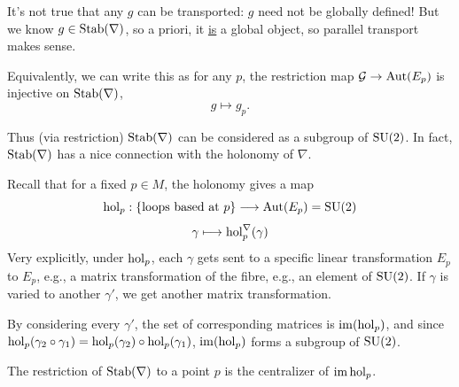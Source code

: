 \documentclass[main]{subfiles}
\begin{document}
\begin{remark}
It's not true that any $g$ can be transported: $g$ need not be globally defined! But we know $g\in\operatorname{Stab}(\nabla)$, so a priori, it \underline{is} a global object, so parallel transport makes sense.
\end{remark}

Equivalently, we can write this as for any $p$, the restriction map $\mathcal{G}\to\operatorname{Aut}(E_p)$ is injective on $\operatorname{Stab}(\nabla)$,
\[
g \longmapsto g_p.
\]

Thus (via restriction) $\operatorname{Stab}(\nabla)$ can be considered as a subgroup of $\operatorname{SU}(2)$. In fact, $\operatorname{Stab}(\nabla)$ has a nice connection with the holonomy of $\nabla$.

Recall that for a fixed $p\in M$, the holonomy gives a map
\[
\operatorname{hol}_p : \left\{\text{loops based at } p\right\} \longrightarrow \operatorname{Aut}(E_p) = \operatorname{SU}(2)
\]
\[
\gamma \longmapsto \operatorname{hol}_p^\nabla(\gamma)
\]
Very explicitly, under $\operatorname{hol}_p$, each $\gamma$ gets sent to a specific linear transformation $E_p$ to $E_p$, e.g., a matrix transformation of the fibre, e.g., an element of $\operatorname{SU}(2)$. If $\gamma$ is varied to another $\gamma'$, we get another matrix transformation.

By considering every $\gamma'$, the set of corresponding matrices is $\operatorname{im}(\operatorname{hol}_p)$, and since $\operatorname{hol}_p(\gamma_2\circ\gamma_1) = \operatorname{hol}_p(\gamma_2)\circ\operatorname{hol}_p(\gamma_1)$, $\operatorname{im}(\operatorname{hol}_p)$ forms a subgroup of $\operatorname{SU}(2)$.

\begin{lemma}
The restriction of $\operatorname{Stab}(\nabla)$ to a point $p$ is the centralizer of $\operatorname{im}\operatorname{hol}_p$.
\end{lemma}
\end{document}
